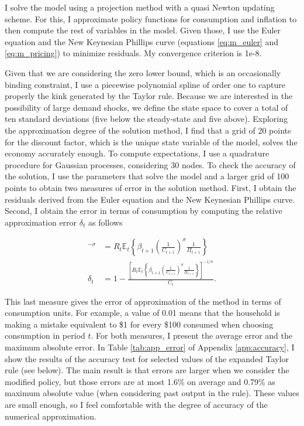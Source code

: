 \documentclass[12pt]{article}
\numberwithin{equation}{section}
\begin{document}
I solve the model using a projection method with a quasi Newton updating scheme. For this, I approximate policy functions for consumption and inflation to then compute the rest of variables in the model. Given those, I use the Euler equation and the New Keynesian Phillips curve (equations \ref{eq:m_euler} and \ref{eq:m_pricing}) to minimize residuals. My convergence criterion is 1e-8.

Given that we are considering the zero lower bound, which is an occasionally binding constraint, I use a piecewise polynomial spline of order one to capture properly the kink generated by the Taylor rule. Because we are interested in the possibility of large demand shocks, we define the state space to cover a total of ten standard deviations (five below the steady-state and five above). Exploring the approximation degree of the solution method, I find that a grid of 20 points for the discount factor, which is the unique state variable of the model, solves the economy accurately enough. To compute expectations, I use a quadrature procedure for Gaussian processes, considering 30 nodes. To check the accuracy of the solution, I use the parameters that solve the model and a larger grid of 100 points to obtain two measures of error in the solution method. First, I obtain the residuals derived from the Euler equation and the New Keynesian Phillips curve. Second, I obtain the error in terms of consumption by computing the relative approximation error $\delta_t$ as follows

\begin{align*}
	[C_t(1-\delta_t)]^{-\sigma}&=R_t\mathbb{E}_t\left\{\beta_{t+1}\left(\frac{1}{C_{t+1}}\right)^{\sigma}\frac{1}{\Pi_{t+1}}\right\}\\
	\delta_t&=1-\frac{\left[R_t\mathbb{E}_t\left\{\beta_{t+1}\left(\frac{1}{C_{t+1}}\right)^{\sigma}\frac{1}{\Pi_{t+1}}\right\}\right]^{-1/\sigma}}{C_t}.
\end{align*}

This last measure gives the error of approximation of the method in terms of consumption units. For example, a value of 0.01 means that the household is making a mistake equivalent to \$1 for every \$100 consumed when choosing consumption in period $t$. For both measures, I present the average error and the maximum absolute error. In Table \ref{tab:app_error} of Appendix \ref{app:accuracy}, I show the results of the accuracy test for selected values of the expanded Taylor rule (see below). The main result is that errors are larger when we consider the modified policy, but those errors are at most 1.6\% on average and 0.79\% as maximum absolute value (when considering past output in the rule). These values are small enough, so I feel comfortable with the degree of accuracy of the numerical approximation.
\end{document}
